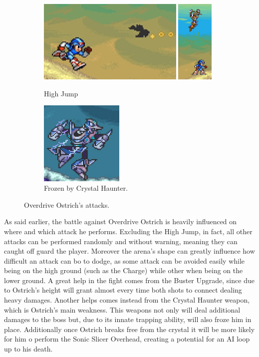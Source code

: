 \begin{figure}
	\ContinuedFloat
	\centering
	\begin{subfigure}{\linewidth}
		\centering
		\includegraphics[height=4cm]{figures/X2/Overdrive_ostrich/Ostrich_background_2.png}
		\includegraphics[height=4cm]{figures/X2/Overdrive_ostrich/Ostrich_background.png}
		\caption{High Jump}
	\end{subfigure}
	\begin{subfigure}{0.4\linewidth}
		\centering
		\includegraphics[height= 4cm]{figures/X2/Overdrive_ostrich/Ostrich_freeze.png}
		\caption{Frozen by Crystal Haunter.}
	\end{subfigure}
	\caption{Overdrive Ostrich's attacks.}	
\end{figure}
As said earlier, the battle against Overdrive Ostrich is heavily influenced on where and which attack he performs. Excluding the High Jump, in fact, all other attacks can be performed randomly and without warning, meaning they can caught off guard the player. Moreover the arena's shape can greatly influence how difficult an attack can bo to dodge, as some attack can be avoided easily while being on the high ground (such as the Charge) while other when being on the lower ground. A great help in the fight comes from the Buster Upgrade, since due to Ostrich's height will grant almost every time both shots to connect dealing heavy damages. Another helps comes instead from the Crystal Haunter weapon, which is Ostrich's main weakness. This weapons not only will deal additional damages to the boss but, due to its innate trapping ability, will also froze him in place. Additionally once Ostrich breaks free from the crystal it will be more likely for him o perform the Sonic Slicer Overhead, creating a potential for an AI loop up to his death.

